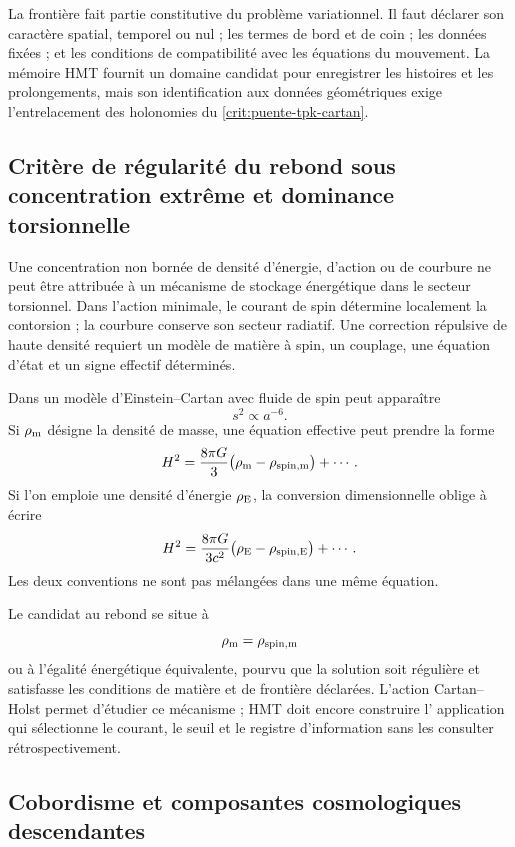 La frontière fait partie constitutive du problème variationnel. Il faut
déclarer son caractère spatial, temporel ou nul ; les termes de bord et de
coin ; les données fixées ; et les conditions de compatibilité avec les
équations du mouvement. La mémoire HMT fournit un domaine candidat
pour enregistrer les histoires et les prolongements, mais son identification aux données
géométriques exige l'entrelacement des holonomies du
\cref{crit:puente-tpk-cartan}.

\subsection{Critère de régularité du rebond sous concentration extrême et dominance torsionnelle}
\label{sec:rebote-cosmologico-condicionado}

Une concentration non bornée de densité d'énergie, d'action ou de courbure ne
peut être attribuée à un mécanisme de stockage énergétique dans le secteur
torsionnel. Dans l'action minimale, le courant de spin détermine localement la
contorsion ; la courbure conserve son secteur radiatif. Une correction
répulsive de haute densité requiert un modèle de matière à spin, un
couplage, une équation d'état et un signe effectif déterminés.

Dans un modèle d'Einstein--Cartan avec fluide de spin peut apparaître
\[
 s^2\propto a^{-6}.
\]
Si \(\rho_{\rm m}\) désigne la densité de masse, une équation effective peut
prendre la forme
\[
 H^2
 =
 \frac{8\pi G}{3}
 \bigl(\rho_{\rm m}-\rho_{\rm spin,m}\bigr)
 +\cdots.
\]
Si l'on emploie une densité d'énergie \(\rho_{\rm E}\), la conversion dimensionnelle
oblige à écrire
\[
 H^2
 =
 \frac{8\pi G}{3c^2}
 \bigl(\rho_{\rm E}-\rho_{\rm spin,E}\bigr)
 +\cdots.
\]
Les deux conventions ne sont pas mélangées dans une même équation.

Le candidat au rebond se situe à
\[
 \rho_{\rm m}=\rho_{\rm spin,m}
\]
ou à l'égalité énergétique équivalente, pourvu que la solution soit régulière
et satisfasse les conditions de matière et de frontière déclarées. L'action
Cartan--Holst permet d'étudier ce mécanisme ; HMT doit encore construire l'
application qui sélectionne le courant, le seuil et le registre d'information sans
les consulter rétrospectivement.

\subsection{Cobordisme et composantes cosmologiques descendantes}
\label{sec:cobordismo-universo-hijo}

